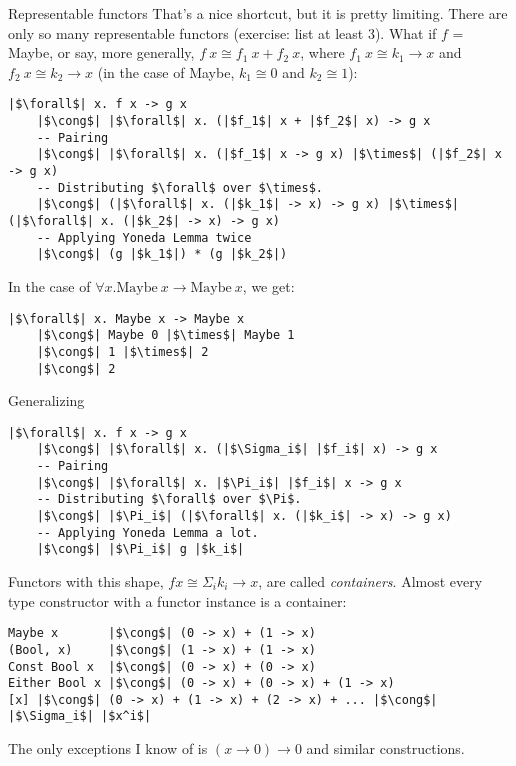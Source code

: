 \documentclass[tikz]{beamer}
\theoremstyle{definition}
\begin{document}
\begin{frame}[fragile]{Representable functors}
That's a nice shortcut, but it is pretty limiting. There are only so many representable functors (exercise: list at least 3).
\newline\newline
What if $f$ = Maybe, or say, more generally, $f~x \cong f_1~x + f_2~x$, where $f_1~x \cong k_1 \to x$ and $f_2~x \cong k_2 \to x$ (in the case of Maybe, $k_1 \cong 0$ and $k_2 \cong 1$):
\end{frame}

\begin{frame}[fragile]
\begin{verbatim}
|$\forall$| x. f x -> g x
    |$\cong$| |$\forall$| x. (|$f_1$| x + |$f_2$| x) -> g x
    -- Pairing
    |$\cong$| |$\forall$| x. (|$f_1$| x -> g x) |$\times$| (|$f_2$| x -> g x)
    -- Distributing $\forall$ over $\times$.
    |$\cong$| (|$\forall$| x. (|$k_1$| -> x) -> g x) |$\times$| (|$\forall$| x. (|$k_2$| -> x) -> g x)
    -- Applying Yoneda Lemma twice
    |$\cong$| (g |$k_1$|) * (g |$k_2$|)
\end{verbatim}
\end{frame}

\begin{frame}[fragile]
In the case of $\forall x. \text{Maybe}~x \to \text{Maybe}~x$, we get:
\begin{verbatim}
|$\forall$| x. Maybe x -> Maybe x
    |$\cong$| Maybe 0 |$\times$| Maybe 1
    |$\cong$| 1 |$\times$| 2
    |$\cong$| 2
\end{verbatim}
\end{frame}

\begin{frame}[fragile]
Generalizing
\begin{verbatim}
|$\forall$| x. f x -> g x
    |$\cong$| |$\forall$| x. (|$\Sigma_i$| |$f_i$| x) -> g x
    -- Pairing
    |$\cong$| |$\forall$| x. |$\Pi_i$| |$f_i$| x -> g x
    -- Distributing $\forall$ over $\Pi$.
    |$\cong$| |$\Pi_i$| (|$\forall$| x. (|$k_i$| -> x) -> g x)
    -- Applying Yoneda Lemma a lot.
    |$\cong$| |$\Pi_i$| g |$k_i$|
\end{verbatim}
\end{frame}

\begin{frame}[fragile]
Functors with this shape, $f x \cong \Sigma_i k_i \to x$, are called {\em containers}. Almost every type constructor with a functor instance is a container:

\begin{verbatim}
Maybe x       |$\cong$| (0 -> x) + (1 -> x)
(Bool, x)     |$\cong$| (1 -> x) + (1 -> x)
Const Bool x  |$\cong$| (0 -> x) + (0 -> x)
Either Bool x |$\cong$| (0 -> x) + (0 -> x) + (1 -> x)
[x] |$\cong$| (0 -> x) + (1 -> x) + (2 -> x) + ... |$\cong$| |$\Sigma_i$| |$x^i$|
\end{verbatim}

The only exceptions I know of is $(x \to 0) \to 0$ and similar constructions.
\end{frame}
\end{document}
